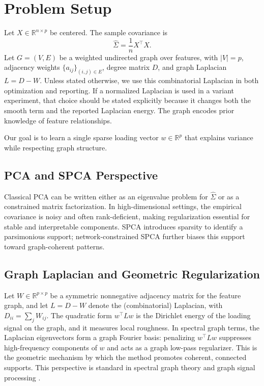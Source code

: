 \documentclass[10pt,twocolumn,letterpaper]{article}
\theoremstyle{definition}
\newcommand{\R}{\mathbb{R}}
\newcommand{\Sigmahat}{\widehat{\Sigma}}
\begin{document}
\section{Problem Setup}
Let $X\in\R^{n\times p}$ be centered. The sample covariance is
\begin{equation}
  \Sigmahat = \frac{1}{n}X^\top X.
\end{equation}
Let $G=(V,E)$ be a weighted undirected graph over features, with $|V|=p$, adjacency weights $\{a_{ij}\}_{(i,j)\in E}$, degree matrix $D$, and graph Laplacian $L=D-W$. Unless stated otherwise, we use this combinatorial Laplacian in both optimization and reporting. If a normalized Laplacian is used in a variant experiment, that choice should be stated explicitly because it changes both the smooth term and the reported Laplacian energy. The graph encodes prior knowledge of feature relationships.

Our goal is to learn a single sparse loading vector $w\in\R^p$ that explains variance while respecting graph structure.

\subsection{PCA and SPCA Perspective}
Classical PCA can be written either as an eigenvalue problem for $\Sigmahat$ or as a constrained matrix factorization. In high-dimensional settings, the empirical covariance is noisy and often rank-deficient, making regularization essential for stable and interpretable components. SPCA introduces sparsity to identify a parsimonious support; network-constrained SPCA further biases this support toward graph-coherent patterns.

\subsection{Graph Laplacian and Geometric Regularization}
Let $W\in\R^{p\times p}$ be a symmetric nonnegative adjacency matrix for the feature graph, and let $L=D-W$ denote the (combinatorial) Laplacian, with $D_{ii}=\sum_j W_{ij}$. The quadratic form $w^\top L w$ is the Dirichlet energy of the loading signal on the graph, and it measures local roughness. In spectral graph terms, the Laplacian eigenvectors form a graph Fourier basis: penalizing $w^\top L w$ suppresses high-frequency components of $w$ and acts as a graph low-pass regularizer. This is the geometric mechanism by which the method promotes coherent, connected supports.
This perspective is standard in spectral graph theory and graph signal processing \cite{chung1997spectral,shuman2013gsp}.
\end{document}
